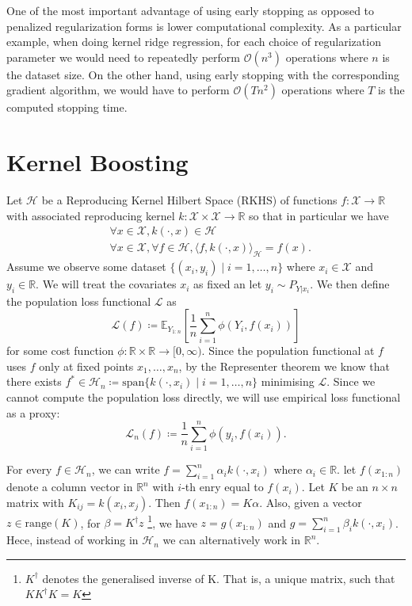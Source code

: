 One of the most important advantage of using early stopping as opposed to penalized
regularization forms is lower computational complexity.
As a particular example, when doing kernel ridge regression, for each choice of
regularization parameter we would need to repeatedly perform $\mathcal{O}(n^{3})$
operations where $n$ is the dataset size. On the other hand, using early stopping
with the corresponding gradient algorithm, we would have to perform $\mathcal{O}(Tn^{2})$
operations where $T$ is the computed stopping time.

\section{Kernel Boosting}

Let $\mathcal{H}$ be a Reproducing Kernel Hilbert Space (RKHS) of functions
$f : \mathcal{X} \to \mathbb{R}$ with associated reproducing kernel
$k : \mathcal{X} \times \mathcal{X} \to \mathbb{R}$ so that in particular we have
\begin{align*}
  &\forall x \in \mathcal{X}, k(\cdot, x) \in \mathcal{H} \\
  &\forall x \in \mathcal{X}, \forall f \in \mathcal{H}, \langle f, k(\cdot, x) \rangle_{\mathcal{H}} = f(x).
\end{align*}
Assume we observe some dataset $\{(x_{i}, y_{i}) \mid i = 1, \dots, n\}$
where $x_{i} \in \mathcal{X}$ and $y_{i} \in \mathbb{R}$.
We will treat the covariates $x_{i}$ as fixed an let $y_{i} \sim P_{Y|x_{i}}$.
We then define the population loss functional $\mathcal{L}$ as
$$
\mathcal{L}(f) \coloneqq \mathbb{E}_{Y_{1:n}}\left[ \frac{1}{n} \sum_{i = 1}^{n} \phi(Y_{i}, f(x_{i})) \right]
$$
for some cost function $\phi : \mathbb{R} \times \mathbb{R} \to [0, \infty)$.
Since the population functional at $f$ uses $f$ only at fixed points $x_{1}, \dots, x_{n}$,
by the Representer theorem we know that there exists
$f^{*} \in \mathcal{H}_{n} \coloneqq \text{span}\{k(\cdot, x_{i}) \mid i = 1, \dots, n\}$
minimising $\mathcal{L}$. Since we cannot compute the population loss directly, we will use
empirical loss functional as a proxy:
$$
\mathcal{L}_{n}(f) \coloneqq \frac{1}{n} \sum_{i=1}^{n} \phi(y_{i}, f(x_{i})).
$$

For every $f \in \mathcal{H}_{n}$, we can write $f = \sum_{i = 1}^{n} \alpha_{i} k(\cdot, x_{i})$
where $\alpha_{i} \in \mathbb{R}$.
let $f(x_{1:n})$ denote a column vector in $\mathbb{R}^{n}$ with $i$-th enry
equal to $f(x_{i})$. Let $K$ be an $n \times n$ matrix with $K_{ij} = k(x_{i}, x_{j})$.
Then $f(x_{1:n}) = K \alpha$.
Also, given a vector $z \in \text{range}(K)$, for
$\beta = K^{\dagger}z$
\footnote{$K^{\dagger}$ denotes the generalised inverse of K. That is,
a unique matrix, such that $KK^{\dagger}K = K$},
we have $z = g(x_{1:n})$ and $g = \sum_{i=1}^{n} \beta_{i}k(\cdot, x_{i})$.
Hece, instead of working in $\mathcal{H}_{n}$ we can alternatively work in $\mathbb{R}^{n}$.


